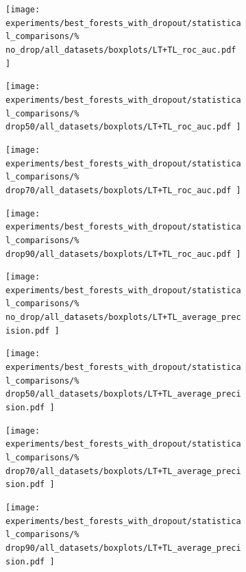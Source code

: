 

\begin{figure}[tb]
    \centering
    \begin{subfigure}{0.24\textwidth}
        \texttt{[image: 
            experiments/best\_forests\_with\_dropout/statistical\_comparisons/\%
            no\_drop/all\_datasets/boxplots/LT+TL\_roc\_auc.pdf
        ]}
    \end{subfigure}
    \begin{subfigure}{0.24\textwidth}
        \texttt{[image: 
            experiments/best\_forests\_with\_dropout/statistical\_comparisons/\%
            drop50/all\_datasets/boxplots/LT+TL\_roc\_auc.pdf
        ]}
    \end{subfigure}
    \begin{subfigure}{0.24\textwidth}
        \texttt{[image: 
            experiments/best\_forests\_with\_dropout/statistical\_comparisons/\%
            drop70/all\_datasets/boxplots/LT+TL\_roc\_auc.pdf
        ]}
    \end{subfigure}
    \begin{subfigure}{0.24\textwidth}
        \texttt{[image: 
            experiments/best\_forests\_with\_dropout/statistical\_comparisons/\%
            drop90/all\_datasets/boxplots/LT+TL\_roc\_auc.pdf
        ]}
    \end{subfigure}

    \begin{subfigure}{0.24\textwidth}
        \texttt{[image: 
            experiments/best\_forests\_with\_dropout/statistical\_comparisons/\%
            no\_drop/all\_datasets/boxplots/LT+TL\_average\_precision.pdf
        ]}
    \end{subfigure}
    \begin{subfigure}{0.24\textwidth}
        \texttt{[image: 
            experiments/best\_forests\_with\_dropout/statistical\_comparisons/\%
            drop50/all\_datasets/boxplots/LT+TL\_average\_precision.pdf
        ]}
    \end{subfigure}
    \begin{subfigure}{0.24\textwidth}
        \texttt{[image: 
            experiments/best\_forests\_with\_dropout/statistical\_comparisons/\%
            drop70/all\_datasets/boxplots/LT+TL\_average\_precision.pdf
        ]}
    \end{subfigure}
    \begin{subfigure}{0.24\textwidth}
        \texttt{[image: 
            experiments/best\_forests\_with\_dropout/statistical\_comparisons/\%
            drop90/all\_datasets/boxplots/LT+TL\_average\_precision.pdf
        ]}
    \end{subfigure}


\end{figure}
